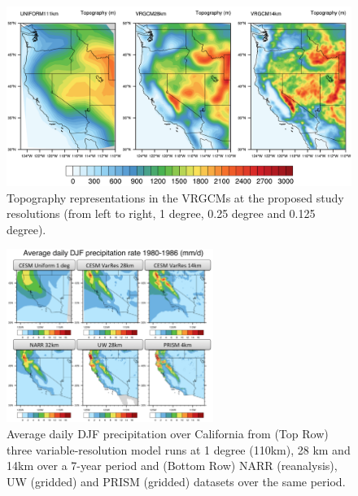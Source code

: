 \documentclass[11pt]{article}
\begin{document}
\begin{figure}
  \begin{center}
  \includegraphics[width=6in]{ModelTopography_Proposal.png}
  \caption{Topography representations in the VRGCMs at the proposed study resolutions (from left to right, 1 degree, 0.25 degree and 0.125 degree).} \label{f3}
  \end{center}
\end{figure}

\begin{figure}
\begin{center}
\includegraphics[width=0.6\textwidth]{VariableResolutionPrecipitation.png}
\end{center}
\caption{Average daily DJF precipitation over California from (Top Row) three variable-resolution model runs at 1 degree (110km), 28 km and 14km over a 7-year period and (Bottom Row) NARR (reanalysis), UW (gridded) and PRISM (gridded) datasets over the same period.} \label{fig:VarResPrecipitation}
\end{figure}
\end{document}
